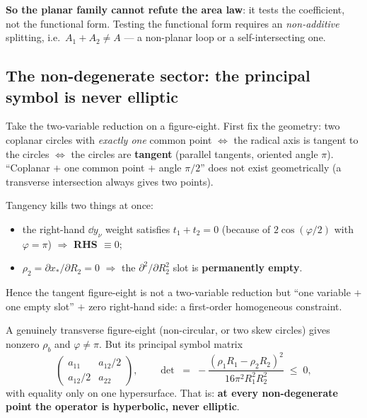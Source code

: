 \noindent
\textbf{So the planar family cannot refute the area law}: it tests the coefficient, not the functional
form. Testing the functional form requires an \emph{non-additive} splitting, i.e.\ $A_1+A_2\neq A$ ---
a non-planar loop or a self-intersecting one. \LT
{}

\subsection{The non-degenerate sector: the principal symbol is never elliptic}

Take the two-variable reduction on a figure-eight. First fix the geometry: two coplanar circles with
\emph{exactly one} common point $\iff$ the radical axis is tangent to the circles $\iff$ the circles
are \textbf{tangent} (parallel tangents, oriented angle $\pi$). ``Coplanar $+$ one common point $+$
angle $\pi/2$'' does not exist geometrically (a transverse intersection always gives two points). \LT
{}

Tangency kills two things at once: \LT
\begin{itemize}
\item the right-hand $\dd y_\nu$ weight satisfies $t_1+t_2=0$ (because of $2\cos(\varphi/2)$ with
      $\varphi=\pi$) $\Rightarrow$ \textbf{RHS $\equiv0$};
\item $\rho_2=\partial x_*/\partial R_2=0$ $\Rightarrow$ the $\partial^{2}/\partial R_2^{2}$ slot is
      \textbf{permanently empty}.
\end{itemize}
Hence the tangent figure-eight is not a two-variable reduction but ``one variable $+$ one empty slot''
$+$ zero right-hand side: a first-order homogeneous constraint. \LN
{}

\noindent
A genuinely transverse figure-eight (non-circular, or two skew circles) gives nonzero $\rho_b$ and
$\varphi\neq\pi$. But its principal symbol matrix
\begin{equation}
  \begin{pmatrix} a_{11} & a_{12}/2\\ a_{12}/2 & a_{22}\end{pmatrix},
  \qquad
  \det \;=\; -\frac{(\rho_1R_1-\rho_2R_2)^{2}}{16\pi^{2}R_1^{2}R_2^{2}} \;\le\; 0 ,
\end{equation}
with equality only on one hypersurface. That is: \textbf{at every non-degenerate point the operator is
hyperbolic, never elliptic}. \LT
{}

